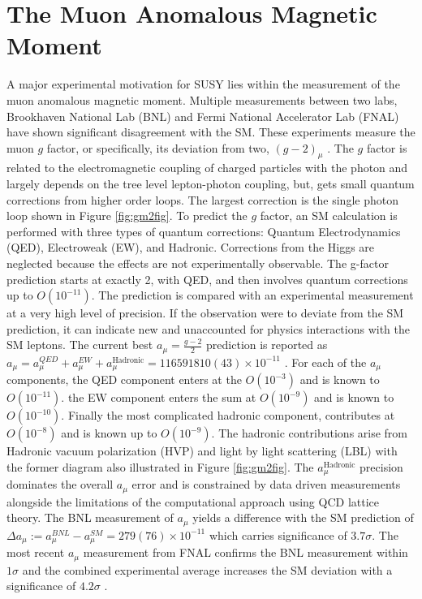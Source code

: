 \section{The Muon Anomalous Magnetic Moment}

A major experimental motivation for SUSY lies within the measurement of the muon anomalous magnetic moment.  Multiple measurements between two labs, Brookhaven National Lab (BNL) and Fermi National Accelerator Lab (FNAL) have shown significant disagreement with the SM. These experiments measure the muon $g$ factor, or specifically, its deviation from two, $(g-2)_\mu$ .  The $g$ factor is related to the electromagnetic coupling of charged particles with the photon and largely depends on the tree level lepton-photon coupling, but, gets small quantum corrections from higher order loops. The largest correction is the single photon loop shown in Figure \ref{fig:gm2fig}. To predict the $g$ factor, an SM calculation is performed with three types of quantum corrections: Quantum Electrodynamics (QED), Electroweak (EW), and Hadronic. Corrections from the Higgs are neglected because the effects are not experimentally observable. %
The g-factor prediction starts at exactly 2, with QED, and then involves quantum corrections up to $O(10^{-11})$. The prediction is compared with an experimental measurement at a very high level of precision. If the observation were to deviate from the SM prediction, it can indicate new and unaccounted for physics interactions with the SM leptons.
The current best $a_\mu = \frac{g-2}{2}$ prediction is reported as $a_\mu= a_\mu^{QED}+ a_\mu^{EW}+a_\mu^{\text{Hadronic}} =  116 591 810(43) \times 10^{-11}$ \cite{Muong-2:2021ojo}.
 For each of the $a_\mu$ components, the QED component enters at the $O(10^{-3})$ and is known to $O(10^{-11})$. the EW component enters the sum at $O(10^{-9})$ and is known to $O(10^{-10})$. Finally the most complicated hadronic component, contributes at $O(10^{-8})$ and is known up to $O(10^{-9})$. The hadronic contributions arise from Hadronic vacuum polarization (HVP) and light by light scattering (LBL) with the former diagram also illustrated in Figure \ref{fig:gm2fig}. The $a_\mu^{\text{Hadronic}}$ precision dominates the overall $a_\mu$ error and is constrained by data driven measurements alongside the limitations of the computational approach using QCD lattice theory. The BNL measurement of $a_\mu$ yields a difference with the SM prediction of $\Delta a_\mu := a_\mu^{BNL} - a_\mu^{SM} = 279(76) \times 10^{-11}$ which carries significance of $3.7\sigma$. The most recent $a_\mu$ measurement from FNAL confirms the BNL measurement within $1\sigma$ and the combined experimental average increases the SM deviation with a significance of $4.2\sigma$ \cite{Muong-2:2021ojo}.


